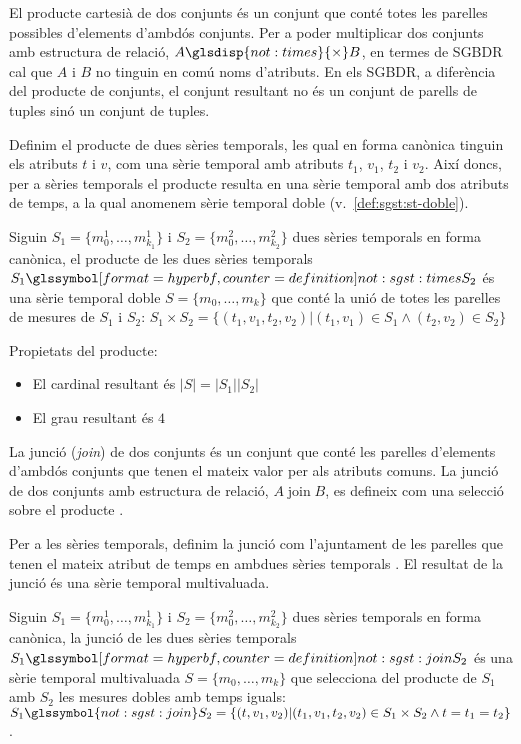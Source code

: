 El producte cartesià de dos conjunts és un conjunt que conté totes les
parelles possibles d'elements d'ambdós conjunts.  Per a poder
multiplicar dos conjunts amb estructura de relació, $A
\glsdisp{not:times}{\times} B$, en termes de \gls{SGBDR} cal que $A$ i
$B$ no tinguin en comú noms d'atributs.  En els \gls{SGBDR}, a
diferència del producte de conjunts, el conjunt resultant no és un
conjunt de parells de tuples sinó un conjunt de tuples.

Definim el producte de dues sèries temporals, les qual en
forma canònica tinguin els atributs $t$ i $v$, com una sèrie temporal
amb atributs $t_1$, $v_1$, $t_2$ i $v_2$. Així doncs, per a sèries
temporals el producte resulta en una sèrie temporal amb dos atributs
de temps, a la qual anomenem sèrie temporal doble (v.\
\autoref{def:sgst:st-doble}).
\begin{definition}[Producte]
  Siguin $S_1=\{m_0^1, \dotsc, m_{k_1}^1\}$ i $S_2=\{m_0^2, \dotsc,
  m_{k_2}^2\}$ dues sèries temporals en forma canònica, el producte de
  les dues sèries temporals $S_1 \glssymboldef{not:sgst:times}
  S_2$ és una sèrie temporal doble $S=\{m_0, \dotsc, m_k\}$ que conté
  la unió de totes les parelles de mesures de $S_1$ i $S_2$: $S_1
  \times S_2 = \{ (t_1,v_1,t_2,v_2) | (t_1,v_1) \in S_1 \wedge
  (t_2,v_2) \in S_2 \}$
\end{definition}

Propietats del producte:
\begin{itemize}
\item El cardinal resultant és $|S|=|S_1||S_2|$
\item El grau resultant és $4$
\end{itemize}



La junció (\emph{join}) de dos conjunts és un conjunt que conté les
parelles d'elements d'ambdós conjunts que tenen el mateix valor per
als atributs comuns.  La junció de dos conjunts amb estructura de
relació, $A \operatorname{join} B$, es defineix com una selecció sobre el
producte \parencite[cap.~7]{date04:introduction8}.


Per a les sèries temporals, definim la junció com l'ajuntament de les
parelles que tenen el mateix atribut de temps en ambdues sèries
temporals . El resultat de la junció és una sèrie temporal
multivaluada.
\begin{definition}[Junció]\label{def:sgst:join}
  Siguin $S_1=\{m_0^1, \dotsc, m_{k_1}^1\}$ i $S_2=\{m_0^2, \dotsc,
  m_{k_2}^2\}$ dues sèries temporals en forma canònica, la junció de
  les dues sèries temporals $S_1 \glssymboldef{not:sgst:join} S_2$ és
  una sèrie temporal multivaluada $S=\{m_0, \dotsc, m_k\}$ que
  selecciona del producte de $S_1$ amb $S_2$ les mesures dobles amb
  temps iguals: $S_1 \glssymbol{not:sgst:join} S_2 = \{ (t,v_1,v_2) |
  (t_1,v_1,t_2,v_2) \in S_1\times S_2 \wedge t=t_1=t_2 \}$.
\end{definition}


